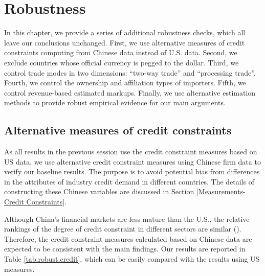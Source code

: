 \documentclass[12pt]{article}
\begin{document}
\section{Robustness} \label{Robustness}

In this chapter, we provide a series of additional robustness checks, which all leave our conclusions unchanged. First, we use alternative measures of credit constraints computing from Chinese data instead of U.S. data. Second, we exclude countries whose official currency is pegged to the dollar. Third, we control trade modes in two dimensions: ``two-way trade'' and ``processing trade''. Fourth, we control the ownership and affiliation types of importers. Fifth, we control revenue-based estimated markups. Finally, we use alternative estimation methods to provide robust empirical evidence for our main arguments.

\subsection{Alternative measures of credit constraints}

As all results in the previous session use the credit constraint measures based on US data, we use alternative credit constraint measures using Chinese firm data to verify our baseline results. The purpose is to avoid potential bias from differences in the attributes of industry credit demand in different countries. The details of constructing these Chinese variables are discussed in Section \ref{Measurements-Credit Constraints}. 

Although China's financial markets are less mature than the U.S., the relative rankings of the degree of credit constraint in different sectors are similar (\cite{manova2013}). Therefore, the credit constraint measures calculated based on Chinese data are expected to be consistent with the main findings. Our results are reported in Table \ref{tab.robust.credit}, which can be easily compared with the results using US measures.
\end{document}
